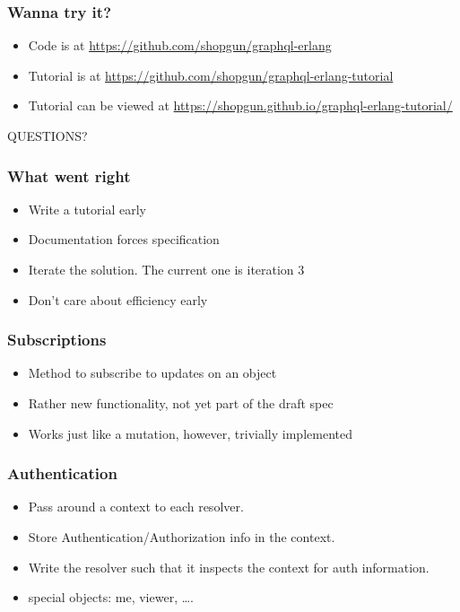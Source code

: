 \documentclass[lualatex]{beamer}
\begin{document}
\begin{frame}
  \frametitle{Wanna try it?}
  \begin{itemize}
  \item Code is at \url{https://github.com/shopgun/graphql-erlang}
  \item Tutorial is at
    \url{https://github.com/shopgun/graphql-erlang-tutorial}
  \item Tutorial can be viewed at
    \url{https://shopgun.github.io/graphql-erlang-tutorial/}
  \end{itemize}
\end{frame}

\begin{frame}
  QUESTIONS?
\end{frame}

\begin{frame}
  \frametitle{What went right}
  \begin{itemize}
  \item Write a tutorial early
  \item Documentation forces specification
  \item Iterate the solution. The current one is iteration 3
  \item Don't care about efficiency early
  \end{itemize}
\end{frame}
\begin{frame}
  \frametitle{Subscriptions}
  \begin{itemize}
  \item Method to subscribe to updates on an object
  \item Rather new functionality, not yet part of the draft spec
  \item Works just like a mutation, however, trivially implemented
  \end{itemize}
\end{frame}

\begin{frame}
  \frametitle{Authentication}
  \begin{itemize}
  \item Pass around a context to each resolver.
  \item Store Authentication/Authorization info in the context.
  \item Write the resolver such that it inspects the context for auth
    information.
  \item special objects: me, viewer, \ldots.
  \end{itemize}
\end{frame}
\end{document}
